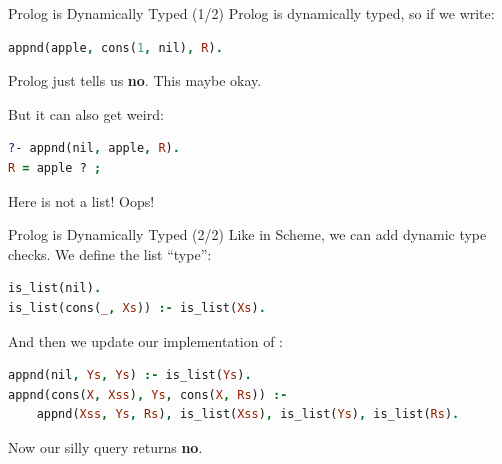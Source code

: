 \begin{frame}[fragile]{Prolog is Dynamically Typed (1/2)}
Prolog is dynamically typed, so if we write:

\begin{lstlisting}[language=prolog, xleftmargin=0.5cm]
appnd(apple, cons(1, nil), R).
\end{lstlisting}

Prolog just tells us \textbf{no}. This maybe okay.

\pause

But it can also get weird:

\begin{lstlisting}[language=prolog, xleftmargin=0.5cm]
?- appnd(nil, apple, R).
R = apple ? ;
\end{lstlisting}

Here  is not a list! Oops!
\end{frame}
    
\begin{frame}[fragile]{Prolog is Dynamically Typed (2/2)}
Like in Scheme, we can add dynamic type checks. We define the list ``type'':

\begin{lstlisting}[language=prolog, xleftmargin=0.5cm]
is_list(nil).
is_list(cons(_, Xs)) :- is_list(Xs).
\end{lstlisting}

\pause

And then we update our implementation of :

\begin{lstlisting}[language=prolog, xleftmargin=0.5cm]
appnd(nil, Ys, Ys) :- is_list(Ys).
appnd(cons(X, Xss), Ys, cons(X, Rs)) :- 
    appnd(Xss, Ys, Rs), is_list(Xss), is_list(Ys), is_list(Rs).
\end{lstlisting}

Now our silly query  returns \textbf{no}.
\end{frame}


